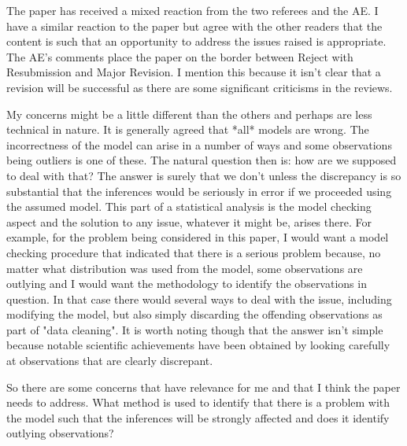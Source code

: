 \documentclass{article}
\begin{document}
The paper has received a mixed reaction from the two referees and the AE. I have a similar reaction to the paper but agree with the other readers that the content is such that an opportunity to address the issues raised is appropriate. The AE's comments place the paper on the border between Reject with Resubmission and Major Revision. I mention this because it isn't clear that a revision will be successful as there are some significant criticisms in the reviews.

My concerns might be a little different than the others and perhaps are less technical in nature. It is generally agreed that *all* models are wrong. The incorrectness of the model can arise in a number of ways and some observations being outliers is one of these. The natural question then is: how are we supposed to deal with that? The answer is surely that we don't unless the discrepancy is so substantial that the inferences would be seriously in error if we proceeded using the assumed model. This part of a statistical analysis is the model checking aspect and the solution to any issue, whatever it might be, arises there. For example, for the problem being considered in this paper, I would want a model checking procedure that indicated that there is a serious problem because, no matter what distribution was used from the model, some observations are outlying and I would want the methodology to identify the observations in question. In that case there would several ways to deal with the issue, including modifying the model, but also simply discarding the offending observations as part of "data cleaning". It is worth noting though that the answer isn't simple because notable scientific achievements have been obtained by looking carefully at observations that are clearly discrepant.

So there are some concerns that have relevance for me and that I think the paper needs to address. What method is used to identify that there is a problem with the model such that the inferences will be strongly affected and does it identify outlying observations? 
\end{document}
